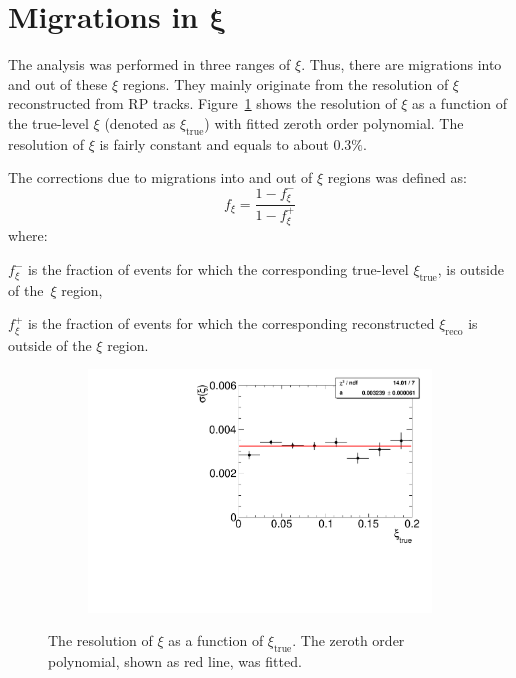 \section[Migrations of $\xi$]{Migrations in $\mathbf{\xi}$}\label{section:star_xi}
The analysis was performed in three ranges of $\xi$. Thus, there are
migrations into and out of these $\xi$ regions. They mainly originate from the resolution of $\xi$ reconstructed from RP tracks. Figure~\ref{fig:xi_correction_resolution} shows the resolution of $\xi$ as a function of the true-level $\xi$ (denoted as $\xi_\textrm{true}$) with fitted zeroth order polynomial. The resolution of $\xi$ is fairly constant and equals to about $0.3\%$.

The corrections due to migrations into and out of  $\xi$ regions was defined as:
 \begin{equation}
 f_{\xi} = \frac{1-f_{\xi}^-}{1-f_{\xi}^+}
 \end{equation}
 where:
 \begin{description}
 	\item $f_{\xi}^-$ is the fraction of events for which the corresponding true-level $\xi_\textrm{true}$, is outside of the~$\xi$ region,
 	\item $f_{\xi}^+$  is the fraction of events for which the corresponding reconstructed $\xi_\textrm{reco}$ is outside of the $\xi$ region.
 \end{description}
 \begin{figure}[h!]
 	\centering
 	\begin{subfigure}{.49\textwidth}
 		\includegraphics[width=\textwidth,page=1]{chapters/chrgSTAR/img/xiMigration/RPresolution.pdf}
 	\end{subfigure}
 	\begin{minipage}{.49\textwidth}
 		\caption{The resolution of $\xi$ as a function of $\xi_\textrm{true}$. The zeroth order polynomial, shown as red line, was fitted.}
 		\label{fig:xi_correction_resolution}
 	\end{minipage}
 \end{figure}
